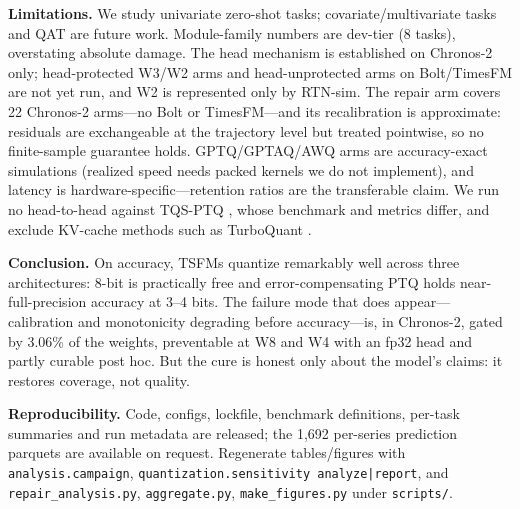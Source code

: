 \documentclass{article}
\begin{document}
\vspace{1pt}\noindent\textbf{Limitations.} We study univariate zero-shot tasks;
covariate/multivariate tasks and QAT are future work. Module-family numbers are dev-tier
(8 tasks), overstating absolute damage. The head mechanism is established on Chronos-2
only; head-protected W3/W2 arms and head-unprotected arms on Bolt/TimesFM are not yet
run, and W2 is represented only by RTN-sim. The repair arm covers 22 Chronos-2
arms---no Bolt or TimesFM---and its recalibration is approximate: residuals are
exchangeable at the trajectory level but treated pointwise, so no finite-sample guarantee
holds. GPTQ/GPTAQ/AWQ arms are accuracy-exact simulations (realized speed needs packed
kernels we do not implement), and latency is hardware-specific---retention ratios are the
transferable claim. We run no head-to-head against TQS-PTQ \citep{tqsptq}, whose
benchmark and metrics differ, and exclude KV-cache methods such as TurboQuant
\citep{turboquant}.

\vspace{1pt}\noindent\textbf{Conclusion.} On accuracy, TSFMs quantize remarkably well
across three architectures: 8-bit is practically free and error-compensating PTQ holds
near-full-precision accuracy at 3--4 bits. The failure mode that does appear---calibration
and monotonicity degrading before accuracy---is, in Chronos-2, gated by 3.06\% of the
weights, preventable at W8 and W4 with an fp32 head and partly curable post hoc. But the
cure is honest only about the model's claims: it restores coverage, not quality.

\vspace{1pt}\noindent\textbf{Reproducibility.} Code, configs, lockfile, benchmark
definitions, per-task summaries and run metadata are released; the 1{,}692 per-series
prediction parquets are available on request. Regenerate tables/figures with
\texttt{analysis.campaign}, \texttt{quantization.sensitivity analyze|report}, and
\texttt{repair\_analysis.py}, \texttt{aggregate.py}, \texttt{make\_figures.py} under
\texttt{scripts/}.



\end{document}
